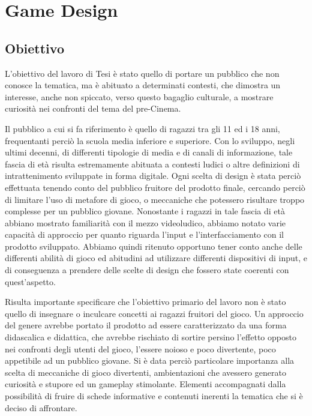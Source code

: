 \chapter{Game Design}
\label{chap:game_design}

\section{Obiettivo}
\label{obiettivo}

L’obiettivo del lavoro di Tesi è stato quello di portare un pubblico che non conosce la tematica, ma è abituato a determinati contesti, che dimostra un interesse, anche non spiccato, verso questo bagaglio culturale, a mostrare curiosità nei confronti del tema del pre-Cinema.

Il pubblico a cui si fa riferimento è quello di ragazzi tra gli 11 ed i 18 anni, frequentanti perciò la scuola media inferiore e superiore. Con lo sviluppo, negli ultimi decenni, di differenti tipologie di media e di canali di informazione, tale fascia di età risulta estremamente abituata a contesti ludici o altre definizioni di intrattenimento sviluppate in forma digitale.
Ogni scelta di design è stata perciò effettuata tenendo conto del pubblico fruitore del prodotto finale, cercando perciò di limitare l’uso di metafore di gioco, o meccaniche che potessero risultare troppo complesse per un pubblico giovane.
Nonostante i ragazzi in tale fascia di età abbiano mostrato familiarità con il mezzo videoludico, abbiamo notato varie capacità di approccio per quanto riguarda l’input e l’interfacciamento con il prodotto sviluppato. Abbiamo quindi ritenuto opportuno tener conto anche delle differenti abilità di gioco ed abitudini ad utilizzare differenti dispositivi di input, e di conseguenza a prendere delle scelte di design che fossero state coerenti con quest’aspetto.

Risulta importante specificare che l’obiettivo primario del lavoro non è stato quello di insegnare o inculcare concetti ai ragazzi fruitori del gioco. Un approccio del genere avrebbe portato il prodotto ad essere caratterizzato da una forma didascalica e didattica, che avrebbe rischiato di sortire persino l’effetto opposto nei confronti degli utenti del gioco, l’essere noioso e poco divertente, poco appetibile ad un pubblico giovane.
Si è data perciò particolare importanza alla scelta di meccaniche di gioco divertenti, ambientazioni che avessero generato curiosità e stupore ed un gameplay stimolante. Elementi accompagnati dalla possibilità di fruire di schede informative e contenuti inerenti la tematica che si è deciso di affrontare.


